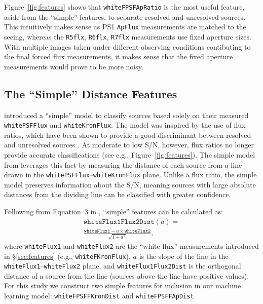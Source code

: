 \documentclass[twocolumn]{aastex63}
\begin{document}
Figure~\ref{fig:features} shows that \texttt{whiteFPSFApRatio} is the most
useful feature, aside from the ``simple'' features, to separate resolved and
unresolved sources. This intuitively makes sense as PS1 \texttt{ApFlux}
measurements are matched to the seeing, whereas the \texttt{R5flx},
\texttt{R6flx}, \texttt{R7flx} measurements use fixed aperture sizes. With
multiple images taken under different observing conditions contibuting to the
final forced flux measurements, it makes sense that the fixed aperture
measurements would prove to be more noisy.

\subsection{The ``Simple'' Distance Features}\label{sec:simple_model}

\citet{Tachibana18} introduced a ``simple'' model to classify sources based
solely on their measured \texttt{whitePSFFlux} and \texttt{whiteKronFlux}. The
model was inspired by the use of flux ratios, which have been shown to provide
a good discriminant between resolved and unresolved sources \citep[e.g., the
SDSS morphological \texttt{CLASS} parameter][]{Lupton01}. At moderate to low
S/N, however, flux ratios no longer provide accurate classifications (see
e.g., Figure~\ref{fig:features}). The simple model from \citet{Tachibana18}
leverages this fact by measuring the distance of each source from a line drawn
in the \texttt{whitePSFFlux}--\texttt{whiteKronFlux} plane. Unlike a flux
ratio, the simple model preserves information about the S/N, meaning sources
with large absolute distances from the dividing line can be classified with
greater confidence.

Following from Equation~3 in \citet{Tachibana18}, ``simple'' features can be
calculated as:
%
\begin{multline}
 \mathtt{whiteFlux1Flux2Dist}(a) = \\
 \frac{\mathtt{whiteFlux1} - a\times\mathtt{whiteFlux2}}{ \sqrt{1 + a^2}},
 \label{eqn:simple_feat}
\end{multline}
%
where \texttt{whiteFlux1} and \texttt{whiteFlux2} are the ``white flux''
measurements introduced in \S\ref{sec:features} (e.g.,
\texttt{whiteFKronFlux}), $a$ is the slope of the line in the
\texttt{whiteFlux1}--\texttt{whiteFlux2} plane, and
\texttt{whiteFlux1Flux2Dist} is the orthogonal distance of a source from the
line (sources above the line have positive values). For this study we
construct two simple features for inclusion in our machine learning model:
\texttt{whiteFPSFFKronDist} and \texttt{whiteFPSFFApDist}.
\end{document}
